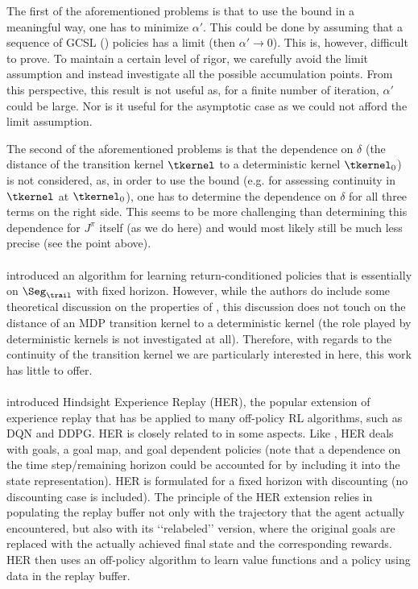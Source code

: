 The first of the aforementioned problems is that to use the bound in a meaningful way, one has to minimize $\alpha'$. This could be done by assuming that a sequence of GCSL (\eUDRL{}) policies has a limit (then $\alpha' \rightarrow 0$).
This is, however, difficult to prove.
To maintain a certain level of rigor, we carefully avoid the limit assumption and instead investigate all the possible accumulation points.
From this perspective, this result is not useful as, for a finite number of iteration, $\alpha'$ could be large.
Nor is it useful for the asymptotic case as we could
not afford the limit assumption.

The second of the aforementioned problems is that the dependence on $\delta$ (the distance of the transition kernel $\tkernel$ to a deterministic kernel
$\tkernel_0$)
is not considered, as, in order to use the bound
(e.g. for assessing continuity in $\tkernel$ at $\tkernel_0$),
one has to determine the dependence on $\delta$
for all three terms on the right side.
This seems to be more challenging than determining this 
dependence for $J^{\pi}$ itself (as we do
here) and would most likely still be much less precise (see the point above).

\paragraph{\citet{kumar2019reward}} introduced an algorithm for learning return-conditioned policies that is essentially \eUDRL{} on $\Seg_{\trail}$ with fixed horizon.
However, while the authors do include some theoretical discussion on the properties of \eUDRL{}, this discussion does not touch on the distance of an MDP transition kernel to a deterministic kernel (the role played by deterministic kernels is not investigated at all). 
Therefore, with regards to the continuity of the transition kernel we are particularly interested in here, this work has little to offer.

\paragraph{\cite{andrychowicz2017hindsight}} introduced Hindsight Experience Replay (HER), the popular extension of experience replay that has be applied to many off-policy RL algorithms, such as DQN and DDPG.
HER is closely related to \eUDRL{} in some aspects.
Like \eUDRL{}, HER deals with goals, a goal map, and goal dependent policies (note that a dependence on the time step/remaining horizon could be accounted for by including it into the state representation).
HER is formulated for a fixed horizon with discounting (no discounting case is included).
The principle of the HER extension relies in populating the replay buffer not only with the trajectory that the agent actually encountered, but also with its \lq\lq{}relabeled\rq\rq{} version, where the original goals are replaced with the actually achieved final state and the corresponding rewards.
HER then uses an off-policy algorithm to learn value functions and a policy using data in the replay buffer.

